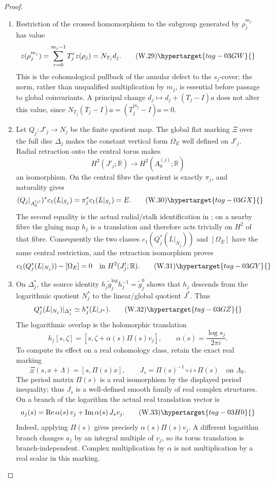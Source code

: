 \begin{proof}

\begin{enumerate}[label={$\langle1\rangle$\arabic*.},leftmargin=*]
\item Restriction of the crossed homomorphism to the subgroup generated by
$\rho_j^{m_j}$ has value
\[
 z(\rho_j^{m_j})
 =\sum_{r=0}^{m_j-1}T_j^rz(\rho_j)=N_{T_j}d_j.
\tag{W.29}\hypertarget{tag-03GW}{}\label{wbII:eq:W:5.17l}
\]
This is the cohomological pullback of the annular defect to the
$s_j$-cover; the norm, rather than unqualified multiplication by $m_j$, is
essential before passage to global coinvariants.  A principal change
$d_j\mapsto d_j+(T_j-I)a$ does not alter this value, since
$N_{T_j}(T_j-I)a=(T_j^{m_j}-I)a=0$.

\item Let $Q_j:J'_j\to N_j$ be the finite quotient map.  The global flat marking
$\Xi$ over the full disc $\Delta_j$ makes the constant vertical form
$\Omega_E$ well defined on $J'_j$.  Radial retraction onto the central
torus makes
\[
 H^2(J'_j;\mathbb R)\longrightarrow H^2(A_0^{(j)};\mathbb R)
\]
an isomorphism.  On the central fibre the quotient is exactly $\pi_j$, and
naturality gives
\[
 (Q_j|_{A_0^{(j)}})^*c_1(L|_{S_j})
 =\pi_j^*c_1(L|_{S_j})=E.
\tag{W.30}\hypertarget{tag-03GX}{}\label{wbII:eq:W:5.17l'}
\]
The second equality is the actual radial/stalk identification in
; on a nearby fibre the gluing map $h_j$
is a translation and therefore acts trivially on $H^2$ of that fibre.
Consequently the two classes
$c_1(Q_j^*(L|_{N_j}))$ and $[\Omega_E]$ have the same central restriction,
and the retraction isomorphism proves
\[
 c_1(Q_j^*(L|_{N_j}))-[\Omega_E]=0
 \quad\text{in }H^2(J'_j;\mathbb R).
\tag{W.31}\hypertarget{tag-03GY}{}\label{wbII:eq:W:5.17l''}
\]

\item On $\Delta_j^*$, the source identity
$h_j\widetilde g_j^{\log}h_j^{-1}=\widetilde g_j^0$ shows that $h_j$
descends from the logarithmic quotient $N_j^*$ to the linear/global
quotient $J^*$.  Thus
\[
 Q_j^*(L|_{N_j})|_{\Delta_j^*}
 \simeq h_j^*(L|_{J^*}).
\tag{W.32}\hypertarget{tag-03GZ}{}\label{wbII:eq:W:5.17l'''}
\]
The logarithmic overlap is the holomorphic translation
\[
 h_j[s,\zeta]=[s,\zeta+\alpha(s)\Pi(s)v_j],
 \qquad \alpha(s)=\frac{\log s_j}{2\pi i}.
\]
To compute its effect on a real cohomology class, retain the exact
real marking
\[
 \Xi(s,x+\Lambda)=[s,\Pi(s)x],\qquad
 J_s=\Pi(s)^{-1}\circ i\circ\Pi(s)
 \quad\text{on }\Lambda_{\mathbb R}.
\]
The period matrix \(\Pi(s)\) is a real isomorphism by the displayed period inequality;
thus \(J_s\) is a well-defined smooth family of real complex
structures.  On a branch of the logarithm the actual real
translation vector is
\[
 a_j(s)=\operatorname{Re}\alpha(s)\,v_j+
        \operatorname{Im}\alpha(s)\,J_s v_j.
 \tag{W.33}\hypertarget{tag-03H0}{}\label{wbII:eq:W:5.17m}
\]
Indeed, applying \(\Pi(s)\) gives precisely
\(\alpha(s)\Pi(s)v_j\).  A different logarithm branch changes
\(a_j\) by an integral multiple of \(v_j\), so its torus translation
is branch-independent.  Complex multiplication by \(\alpha\) is
not multiplication by a real scalar in this marking.


\end{enumerate}
\end{proof}
